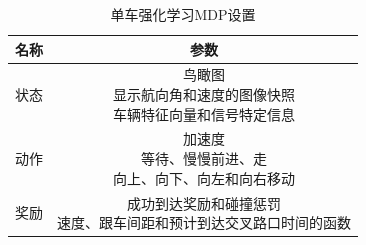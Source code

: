 \begin{table}[htb]
  \small
  \centering
  \caption{单车强化学习MDP设置}
  \label{tab:revi-1}
  \begin{tabular}{cc}
	\toprule[1.5pt]
	名称 & 参数  \\ 
	\midrule[0.75]
	状态 & \makecell{鸟瞰图 \\ 显示航向角和速度的图像快照 \\ 车辆特征向量和信号特定信息} \\
	动作 &  \makecell{加速度 \\ 等待、慢慢前进、走 \\ 向上、向下、向左和向右移动} \\
	奖励 & \makecell{成功到达奖励和碰撞惩罚 \\ 速度、跟车间距和预计到达交叉路口时间的函数} \\
	\bottomrule[1.5pt]
  \end{tabular}
\end{table}
